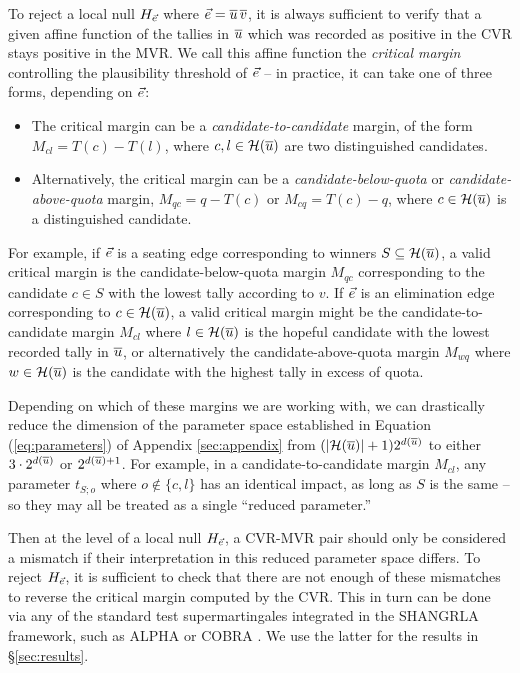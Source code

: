 To reject a local null $H_{\ve}$ where $\ve = \ou\, \ov$, it is always sufficient to verify that a given affine function of the tallies in $\overline{u}$ which was recorded as positive in the CVR stays positive in the MVR. We call this affine function the \emph{critical margin} controlling the plausibility threshold of $\ve$ -- in practice, it can take one of three forms, depending on $\ve$:
\begin{itemize}
	\item The critical margin can be a \emph{candidate-to-candidate} margin, of the form $M_{cl} = T(c) - T(l)$, where $c, l \in \mathcal{H}(\overline{u})$ are two distinguished candidates.
	\item Alternatively, the critical margin can be a \emph{candidate-below-quota} or \emph{candidate-above-quota} margin, $M_{qc} = q-T(c)$ or $M_{cq} = T(c) -q$, where $c\in\mathcal{H}(\overline{u})$ is a distinguished candidate.
\end{itemize}
For example, if $\ve$ is a seating edge corresponding to winners $S\subseteq \mathcal{H}(\overline{u})$, a valid critical margin is the candidate-below-quota margin $M_{qc}$ corresponding to the candidate $c\in S$ with the lowest tally according to $v$. 
If $\ve$ is an elimination edge corresponding to $c\in \mathcal{H}(\overline{u})$, a valid critical margin might be the candidate-to-candidate margin $M_{cl}$ where $l\in \mathcal{H}(\overline{u})$ is the hopeful candidate with the lowest recorded tally in $\overline{u}$, or alternatively the candidate-above-quota margin $M_{wq}$ where $w\in \mathcal{H}(\overline{u})$ is the candidate with the highest tally in excess of quota.

Depending on which of these margins we are working with, we can drastically reduce the dimension of the parameter space established in Equation (\ref{eq:parameters}) of Appendix \ref{sec:appendix} from $(|\mathcal{H}(\overline{u})|+1)2^{d(\overline{u})}$ to either $3\cdot 2^{d(\overline{u})}$ or $2^{d(\overline{u})+1}$.
For example, in a candidate-to-candidate margin $M_{cl}$, any parameter $t_{S;o}$ where $o\notin \{c,l\}$ has an identical impact, as long as $S$ is the same -- so they may all be treated as a single ``reduced parameter.''

Then at the level of a local null $H_{\ve}$, a CVR-MVR pair should only be considered a mismatch if their interpretation in this reduced parameter space differs.
To reject $H_{\ve}$, it is sufficient to check that there are not enough of these mismatches to reverse the critical margin computed by the CVR.
This in turn can be done via any of the standard test supermartingales integrated in the SHANGRLA framework, such as ALPHA or COBRA \cite{starkALPHAAuditThat2023c,spertusCOBRAComparisonOptimalBetting2023}.
We use the latter for the results in \S\ref{sec:results}.

